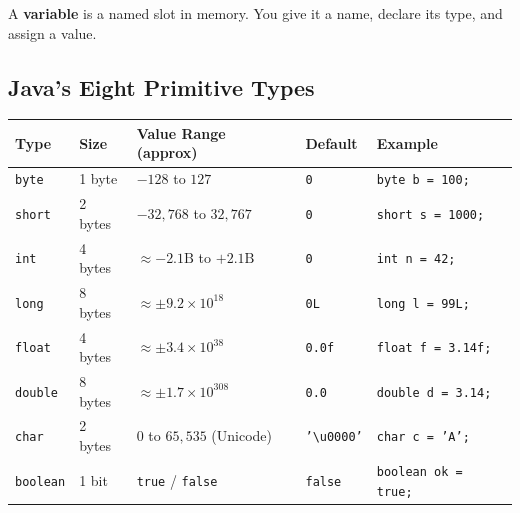 \documentclass[12pt,a4paper,oneside]{book}
\renewcommand{\arraystretch}{1.35}
\begin{document}
A \textbf{variable} is a named slot in memory. You give it a name, declare its type, and assign a value.

\begin{center}
\end{center}

\subsection{Java's Eight Primitive Types}

\begin{center}
{\setlength{\arrayrulewidth}{0.4pt}%
\renewcommand{\arraystretch}{1.4}%
\begin{tabular}{!{\color{black!30}\vrule}l!{\color{black!30}\vrule}l!{\color{black!30}\vrule}l!{\color{black!30}\vrule}l!{\color{black!30}\vrule}l!{\color{black!30}\vrule}}
\toprule
\textbf{Type} & \textbf{Size} & \textbf{Value Range (approx)} & \textbf{Default} & \textbf{Example}\\
\midrule
\texttt{byte}    & 1 byte  & $-128$ to $127$                          & \texttt{0}     & \texttt{byte b = 100;}\\
\texttt{short}   & 2 bytes & $-32{,}768$ to $32{,}767$                & \texttt{0}     & \texttt{short s = 1000;}\\
\texttt{int}     & 4 bytes & $\approx -2.1\text{B}$ to $+2.1\text{B}$& \texttt{0}     & \texttt{int n = 42;}\\
\texttt{long}    & 8 bytes & $\approx \pm 9.2 \times 10^{18}$         & \texttt{0L}    & \texttt{long l = 99L;}\\
\texttt{float}   & 4 bytes & $\approx \pm 3.4 \times 10^{38}$         & \texttt{0.0f}  & \texttt{float f = 3.14f;}\\
\texttt{double}  & 8 bytes & $\approx \pm 1.7 \times 10^{308}$        & \texttt{0.0}   & \texttt{double d = 3.14;}\\
\texttt{char}    & 2 bytes & $0$ to $65{,}535$ (Unicode)               & \texttt{'\textbackslash{}u0000'} & \texttt{char c = 'A';}\\
\texttt{boolean} & 1 bit   & \texttt{true} / \texttt{false}           & \texttt{false} & \texttt{boolean ok = true;}\\
\bottomrule
\end{tabular}}
\end{center}
\end{document}
